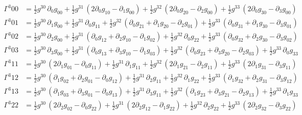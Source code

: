 \documentclass[
]{article}
\begin{document}
\[\begin{aligned}
\Gamma^{3}_{}{00} &= \tfrac{1}{2} g^{30}\, \partial_{0} g_{00} + \tfrac{1}{2} g^{31}\, \left( 2 \partial_{0} g_{10} - \partial_{1} g_{00} \right) + \tfrac{1}{2} g^{32}\, \left( 2 \partial_{0} g_{20} - \partial_{2} g_{00} \right) + \tfrac{1}{2} g^{33}\, \left( 2 \partial_{0} g_{30} - \partial_{3} g_{00} \right) \\
\Gamma^{3}_{}{01} &= \tfrac{1}{2} g^{30}\, \partial_{1} g_{00} + \tfrac{1}{2} g^{31}\, \partial_{0} g_{11} + \tfrac{1}{2} g^{32}\, \left( \partial_{0} g_{21} + \partial_{1} g_{20} - \partial_{2} g_{01} \right) + \tfrac{1}{2} g^{33}\, \left( \partial_{0} g_{31} + \partial_{1} g_{30} - \partial_{3} g_{01} \right) \\
\Gamma^{3}_{}{02} &= \tfrac{1}{2} g^{30}\, \partial_{2} g_{00} + \tfrac{1}{2} g^{31}\, \left( \partial_{0} g_{12} + \partial_{2} g_{10} - \partial_{1} g_{02} \right) + \tfrac{1}{2} g^{32}\, \partial_{0} g_{22} + \tfrac{1}{2} g^{33}\, \left( \partial_{0} g_{32} + \partial_{2} g_{30} - \partial_{3} g_{02} \right) \\
\Gamma^{3}_{}{03} &= \tfrac{1}{2} g^{30}\, \partial_{3} g_{00} + \tfrac{1}{2} g^{31}\, \left( \partial_{0} g_{13} + \partial_{3} g_{10} - \partial_{1} g_{03} \right) + \tfrac{1}{2} g^{32}\, \left( \partial_{0} g_{23} + \partial_{3} g_{20} - \partial_{2} g_{03} \right) + \tfrac{1}{2} g^{33}\, \partial_{0} g_{33} \\
\Gamma^{3}_{}{11} &= \tfrac{1}{2} g^{30}\, \left( 2 \partial_{1} g_{01} - \partial_{0} g_{11} \right) + \tfrac{1}{2} g^{31}\, \partial_{1} g_{11} + \tfrac{1}{2} g^{32}\, \left( 2 \partial_{1} g_{21} - \partial_{2} g_{11} \right) + \tfrac{1}{2} g^{33}\, \left( 2 \partial_{1} g_{31} - \partial_{3} g_{11} \right) \\
\Gamma^{3}_{}{12} &= \tfrac{1}{2} g^{30}\, \left( \partial_{1} g_{02} + \partial_{2} g_{01} - \partial_{0} g_{12} \right) + \tfrac{1}{2} g^{31}\, \partial_{2} g_{11} + \tfrac{1}{2} g^{32}\, \partial_{1} g_{22} + \tfrac{1}{2} g^{33}\, \left( \partial_{1} g_{32} + \partial_{2} g_{31} - \partial_{3} g_{12} \right) \\
\Gamma^{3}_{}{13} &= \tfrac{1}{2} g^{30}\, \left( \partial_{1} g_{03} + \partial_{3} g_{01} - \partial_{0} g_{13} \right) + \tfrac{1}{2} g^{31}\, \partial_{3} g_{11} + \tfrac{1}{2} g^{32}\, \left( \partial_{1} g_{23} + \partial_{3} g_{21} - \partial_{2} g_{13} \right) + \tfrac{1}{2} g^{33}\, \partial_{1} g_{33} \\
\Gamma^{3}_{}{22} &= \tfrac{1}{2} g^{30}\, \left( 2 \partial_{2} g_{02} - \partial_{0} g_{22} \right) + \tfrac{1}{2} g^{31}\, \left( 2 \partial_{2} g_{12} - \partial_{1} g_{22} \right) + \tfrac{1}{2} g^{32}\, \partial_{2} g_{22} + \tfrac{1}{2} g^{33}\, \left( 2 \partial_{2} g_{32} - \partial_{3} g_{22} \right) \\

\end{aligned}\]
\end{document}
